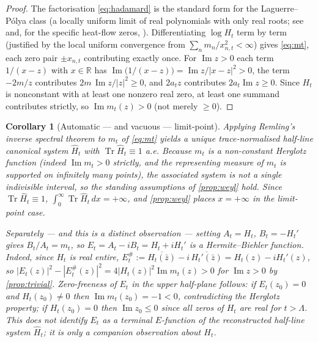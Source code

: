 \documentclass[12pt,a4paper]{amsart}
\theoremstyle{plain}
\newtheorem{corollary}[theorem]{Corollary}
\theoremstyle{definition}
\newcommand{\R}{\mathbb{R}}
\newcommand{\Tr}{\operatorname{Tr}}
\newcommand{\Ham}{H}
\begin{document}
\begin{proof}
  The factorisation \cref{eq:hadamard} is the standard form for the
  Laguerre--P\'olya class (a locally uniform limit of real polynomials
  with only real roots; see \cite{Newman1976} and, for the specific
  heat-flow zeros, \cite{KiKimLee2009,RodgersTao2020}).  Differentiating
  $\log H_t$ term by term (justified by the local uniform convergence
  from $\sum_n m_n/x_{n,t}^2 < \infty$) gives \cref{eq:mt}, each zero pair
  $\pm x_{n,t}$ contributing exactly once.  For $\operatorname{Im}z>0$
  each term $1/(x-z)$ with $x\in\R$ has
  $\operatorname{Im}\bigl(1/(x-z)\bigr) = \operatorname{Im}z/|x-z|^2 > 0$,
  the term $-2m/z$ contributes $2m\,\operatorname{Im}z/|z|^2 \ge 0$, and
  $2a_t z$ contributes $2a_t\operatorname{Im}z \ge 0$.  Since $H_t$ is
  nonconstant with at least one nonzero real zero, at least one summand
  contributes strictly, so $\operatorname{Im}m_t(z) > 0$ (not merely
  $\ge0$).
\end{proof}

\begin{corollary}[Automatic --- and vacuous --- limit-point]\label{cor:trivial}
  Applying Remling's inverse spectral theorem
  \cite[Theorem~5.1]{Remling2018} to $m_t$ of \cref{eq:mt} yields a
  \emph{unique trace-normalised} half-line canonical system
  $\widehat\Ham_t$ with $\Tr\widehat\Ham_t \equiv 1$ a.e.  Because $m_t$
  is a non-constant Herglotz function (indeed $\operatorname{Im}m_t>0$
  strictly, and the representing measure of $m_t$ is supported on
  infinitely many points), the associated system is not a single
  indivisible interval, so the standing assumptions of \cref{prop:weyl}
  hold.  Since
  $\Tr\widehat\Ham_t\equiv1$, $\int_0^\infty \Tr\widehat\Ham_t\,dx =
  +\infty$, and \cref{prop:weyl} places $x=+\infty$ in the limit-point
  case.

  Separately --- and this is a distinct observation --- setting
  $A_t = H_t$, $B_t = -H_t'$ gives $B_t/A_t = m_t$, so
  $E_t = A_t - iB_t = H_t + iH_t'$ is a Hermite--Biehler function.
  Indeed, since $H_t$ is real entire, $E_t^\# := \overline{H_t(\bar z)} -
  i\,\overline{H_t'(\bar z)} = H_t(z) - iH_t'(z)$, so
  $|E_t(z)|^2 - |E_t^\#(z)|^2 = 4|H_t(z)|^2\operatorname{Im}m_t(z) > 0$
  for $\operatorname{Im}z>0$ by \cref{prop:trivial}.  Zero-freeness of
  $E_t$ in the upper half-plane follows: if $E_t(z_0)=0$ and
  $H_t(z_0)\neq0$ then $\operatorname{Im}m_t(z_0) = -1 < 0$,
  contradicting the Herglotz property; if $H_t(z_0)=0$ then
  $\operatorname{Im}z_0 \le 0$ since all zeros of $H_t$ are real for
  $t>\Lambda$.  This does \emph{not} identify $E_t$ as a terminal
  $E$-function of the reconstructed half-line system $\widehat\Ham_t$; it
  is only a companion observation about $H_t$.
\end{corollary}
\end{document}
